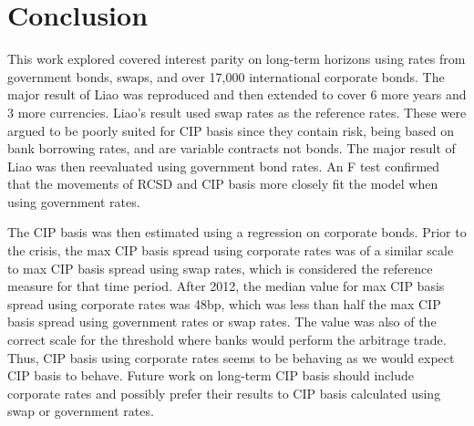 


\section{Conclusion} \label{conclusion_chapter}

This work explored covered interest parity on long-term horizons using rates from government bonds, swaps, and over 17,000 international corporate bonds.  The major result of Liao\cite{Liao2016} was reproduced and then extended to cover 6 more years and 3 more currencies.  Liao's result used swap rates as the reference rates.  These were argued to be poorly suited for CIP basis since they contain risk, being based on bank borrowing rates, and are variable contracts not bonds.  The major result of Liao was then reevaluated using government bond rates.  An F test confirmed that the movements of RCSD and CIP basis more closely fit the model when using government rates.

The CIP basis was then estimated using a regression on corporate bonds.  Prior to the crisis, the max CIP basis spread using corporate rates was of a similar scale to max CIP basis spread using swap rates, which is considered the reference measure for that time period.   After 2012, the median value for max CIP basis spread using corporate rates was 48bp, which was less than half the max CIP basis spread using government rates or swap rates.  The value was also of the correct scale for the threshold where banks would perform the arbitrage trade.  Thus, CIP basis using corporate rates seems to be behaving as we would expect CIP basis to behave.  Future work on long-term CIP basis should include corporate rates and possibly prefer their results to CIP basis calculated using swap or government rates. 

